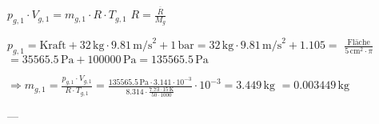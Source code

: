 \( p_{g,1} \cdot V_{g,1} = m_{g,1} \cdot R \cdot T_{g,1} \)  
\( R = \frac{\overline{R}}{M_g} \)  

\( p_{g,1} = \text{Kraft} + 32 \, \text{kg} \cdot 9.81 \, \text{m/s}^2 + 1 \, \text{bar} = 32 \, \text{kg} \cdot 9.81 \, \text{m/s}^2 + 1.105 = \)  
\( \frac{\text{Fläche}}{5 \, \text{cm}^2 \cdot \pi} \)  
\( = 35565.5 \, \text{Pa} + 100000 \, \text{Pa} = 135565.5 \, \text{Pa} \)  

\( \Rightarrow m_{g,1} = \frac{p_{g,1} \cdot V_{g,1}}{R \cdot T_{g,1}} = \frac{135565.5 \, \text{Pa} \cdot 3.141 \cdot 10^{-3}}{8.314 \cdot \frac{7.73 \cdot 15 \, \text{K}}{50 \cdot 1000}} \cdot 10^{-3} = 3.449 \, \text{kg} \)  
\( = 0.003449 \, \text{kg} \)  

---